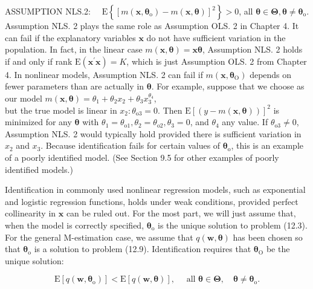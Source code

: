 \documentclass[10pt]{article}
\begin{document}
ASSUMPTION NLS.2: $\quad \mathrm{E}\left\{\left[m\left(\mathbf{x}, \boldsymbol{\theta}_{\mathrm{o}}\right)-m(\mathbf{x}, \boldsymbol{\theta})\right]^{2}\right\}>0$, all $\boldsymbol{\theta} \in \boldsymbol{\Theta}, \boldsymbol{\theta} \neq \boldsymbol{\theta}_{\mathrm{o}}$.\\
Assumption NLS. 2 plays the same role as Assumption OLS. 2 in Chapter 4. It can fail if the explanatory variables $\mathbf{x}$ do not have sufficient variation in the population. In fact, in the linear case $m(\mathbf{x}, \boldsymbol{\theta})=\mathbf{x} \boldsymbol{\theta}$, Assumption NLS. 2 holds if and only if rank $\mathrm{E}\left(\mathbf{x}^{\prime} \mathbf{x}\right)=K$, which is just Assumption OLS. 2 from Chapter 4. In nonlinear models, Assumption NLS. 2 can fail if $m\left(\mathbf{x}, \boldsymbol{\theta}_{\mathrm{O}}\right)$ depends on fewer parameters than are actually in $\boldsymbol{\theta}$. For example, suppose that we choose as our model $m(\mathbf{x}, \boldsymbol{\theta})=\theta_{1}+\theta_{2} x_{2}+\theta_{3} x_{3}^{\theta_{4}}$,\\
but the true model is linear in $x_{2}: \theta_{\mathrm{o} 3}=0$. Then $\mathrm{E}[(y-m(\mathbf{x}, \boldsymbol{\theta}))]^{2}$ is minimized for any $\boldsymbol{\theta}$ with $\theta_{1}=\theta_{\mathrm{o} 1}, \theta_{2}=\theta_{\mathrm{o} 2}, \theta_{3}=0$, and $\theta_{4}$ any value. If $\theta_{\mathrm{o} 3} \neq 0$, Assumption NLS. 2 would typically hold provided there is sufficient variation in $x_{2}$ and $x_{3}$. Because identification fails for certain values of $\boldsymbol{\theta}_{\mathrm{o}}$, this is an example of a poorly identified model. (See Section 9.5 for other examples of poorly identified models.)

Identification in commonly used nonlinear regression models, such as exponential and logistic regression functions, holds under weak conditions, provided perfect collinearity in $\mathbf{x}$ can be ruled out. For the most part, we will just assume that, when the model is correctly specified, $\boldsymbol{\theta}_{\mathrm{o}}$ is the unique solution to problem (12.3). For the general M-estimation case, we assume that $q(\mathbf{w}, \boldsymbol{\theta})$ has been chosen so that $\boldsymbol{\theta}_{\mathrm{o}}$ is a solution to problem (12.9). Identification requires that $\boldsymbol{\theta}_{\mathrm{O}}$ be the unique solution:


\begin{equation*}
\mathrm{E}\left[q\left(\mathbf{w}, \boldsymbol{\theta}_{\mathrm{o}}\right)\right]<\mathrm{E}[q(\mathbf{w}, \boldsymbol{\theta})], \quad \text { all } \boldsymbol{\theta} \in \boldsymbol{\Theta}, \quad \boldsymbol{\theta} \neq \boldsymbol{\theta}_{\mathrm{o}} . \tag{12.11}
\end{equation*}
\end{document}
